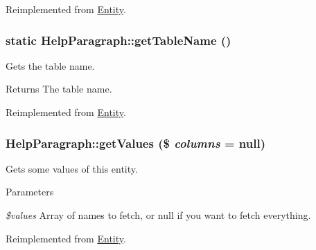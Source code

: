 Reimplemented from \hyperlink{classEntity_a61bbfbb4058427174e002a09ddc77c41}{Entity}.

\hypertarget{classHelpParagraph_a646492a40dad4d4a5cad0cd93e4e7cdb}{
\subsubsection[{getTableName}]{\setlength{\rightskip}{0pt plus 5cm}static HelpParagraph::getTableName ()}}
\label{classHelpParagraph_a646492a40dad4d4a5cad0cd93e4e7cdb}
Gets the table name.

\begin{DoxyReturn}{Returns}
The table name. 
\end{DoxyReturn}


Reimplemented from \hyperlink{classEntity_a8305fd94740ac62cbafb9de76567ce37}{Entity}.

\hypertarget{classHelpParagraph_ab86c3034d2e3c9178c83abbc3eca8ee3}{
\subsubsection[{getValues}]{\setlength{\rightskip}{0pt plus 5cm}HelpParagraph::getValues (\$ {\em columns} = {\ttfamily null})}}
\label{classHelpParagraph_ab86c3034d2e3c9178c83abbc3eca8ee3}
Gets some values of this entity.


\begin{DoxyParams}{Parameters}
\item[{\em \$values}]Array of names to fetch, or null if you want to fetch everything. \end{DoxyParams}


Reimplemented from \hyperlink{classEntity_aec1be209327cfcf2dc528a3a565a7a5f}{Entity}.



